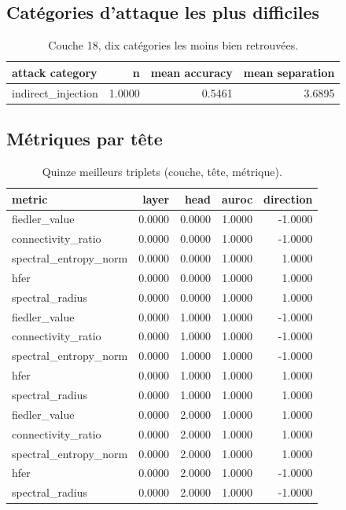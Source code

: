 \documentclass[11pt,a4paper]{article}
\begin{document}
\subsection{Catégories d'attaque les plus difficiles}

\begin{table}[htbp]
\centering
\small
\begin{tabular}{lrrr}
\hline
attack category & n & mean accuracy & mean separation \\
\hline
indirect\_injection & 1.0000 & 0.5461 & 3.6895 \\
\hline
\end{tabular}
\caption{Couche 18, dix catégories les moins bien retrouvées.}
\label{tab:categories}
\end{table}

\subsection{Métriques par tête}

\begin{table}[htbp]
\centering
\small
\begin{tabular}{lrrrr}
\hline
metric & layer & head & auroc & direction \\
\hline
fiedler\_value & 0.0000 & 0.0000 & 1.0000 & -1.0000 \\
connectivity\_ratio & 0.0000 & 0.0000 & 1.0000 & -1.0000 \\
spectral\_entropy\_norm & 0.0000 & 0.0000 & 1.0000 & 1.0000 \\
hfer & 0.0000 & 0.0000 & 1.0000 & 1.0000 \\
spectral\_radius & 0.0000 & 0.0000 & 1.0000 & 1.0000 \\
fiedler\_value & 0.0000 & 1.0000 & 1.0000 & -1.0000 \\
connectivity\_ratio & 0.0000 & 1.0000 & 1.0000 & -1.0000 \\
spectral\_entropy\_norm & 0.0000 & 1.0000 & 1.0000 & -1.0000 \\
hfer & 0.0000 & 1.0000 & 1.0000 & 1.0000 \\
spectral\_radius & 0.0000 & 1.0000 & 1.0000 & 1.0000 \\
fiedler\_value & 0.0000 & 2.0000 & 1.0000 & 1.0000 \\
connectivity\_ratio & 0.0000 & 2.0000 & 1.0000 & 1.0000 \\
spectral\_entropy\_norm & 0.0000 & 2.0000 & 1.0000 & 1.0000 \\
hfer & 0.0000 & 2.0000 & 1.0000 & -1.0000 \\
spectral\_radius & 0.0000 & 2.0000 & 1.0000 & -1.0000 \\
\hline
\end{tabular}
\caption{Quinze meilleurs triplets (couche, tête, métrique).}
\label{tab:heads}
\end{table}
\end{document}
